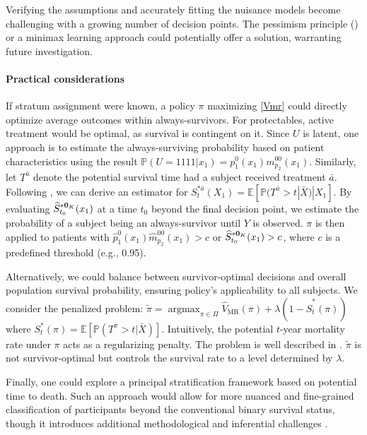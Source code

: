 \documentclass{article}
\newcommand{\wh}{\widehat}
\newcommand{\pr}{\mathbb{P}}
\newcommand{\tred}{{}}   %
\begin{document}
{Verifying the assumptions and accurately fitting the nuisance models become challenging with a growing number of decision points. 
The pessimism principle (\citealp{jin2021pessimism}) or a minimax learning approach \citep{kallus2021minimax} could potentially offer a solution, warranting future investigation.}



%	
%
\paragraph{Practical considerations}
If stratum assignment were known, a policy $\pi$ maximizing \eqref{Vmr} could directly optimize average outcomes within always-survivors. For protectables, active treatment would be optimal, as survival is contingent on it. 
Since $U$ is latent, one approach is to estimate the always-surviving probability based on patient characteristics using the result $\pr(U=1111|x_1) = p_1^0(x_1)m_{p_2}^{00}(x_1)$. 
Similarly, let $T^{\bar a}$ denote the potential survival time had a subject received treatment $\bar a$. Following \cite{tyeardtr}, we can derive an estimator for $S_t^{*\bar a}(X_1) = \mathbb{E}[ \pr(T^{\bar a} > t | \bar X) | X_1 ]$. By evaluating $\wh S_{t_0}^{*{\bf0}_K}(x_1)$ at a time $t_0$ beyond the final decision point, we estimate the probability of a subject being an always-survivor until $Y$ is observed. $\pi$ is then applied to patients with $\hat{p}_1^0(x_1)\hat{m}_{p_2}^{00}(x_1) > c$ or $\wh S_{t_0}^{*{\bf0}_K}(x_1) > c$, where $c$ is a predefined threshold (e.g., 0.95).

Alternatively, we could balance between survivor-optimal decisions and overall population survival probability, ensuring policy's applicability to all subjects. We consider the penalized problem:
$
\tilde\pi = \mathop{\textrm{argmax}} _{\pi\in\Pi} \wh V_\textrm{MR}(\pi) + \lambda (1-\wh S_t^{*}(\pi))
$
where $S_t^*(\pi) = \mathbb{E}[ \pr(T^{\pi} > t | \bar X) ]$. Intuitively, the potential $t$-year mortality rate under $\pi$ acts as a regularizing penalty. The problem is well described in \cite{restrdtr}.
$\tilde\pi$ is not survivor-optimal but controls the survival rate to a level determined by $\lambda$. 

\tred{
Finally, one could explore a principal stratification framework based on potential time to death. Such an approach would allow for more nuanced and fine-grained classification of participants beyond the conventional binary survival status, though it introduces additional methodological and inferential challenges \citep{zhang2025semiparametric}.
}
\end{document}
